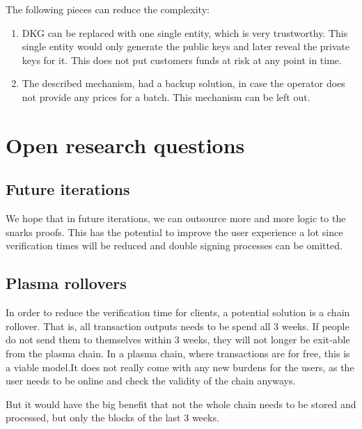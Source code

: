 \documentclass[11pt,parskip=full]{scrartcl}%
\begin{document}
The following pieces can reduce the complexity:
\begin{enumerate}
\item
DKG can be replaced with one single entity, which is very trustworthy.
This single entity would only generate the public keys and later reveal the private keys for it.
This does not put customers funds at risk at any point in time.
\item
The described mechanism, had a backup solution, in case the operator does not provide any prices for a batch.
This mechanism can be left out.
\end{enumerate}

\section{Open research questions}

\subsection{Future iterations}
We hope that in future iterations, we can outsource more and more logic to the snarks proofs.
This has the potential to improve the user experience a lot since verification times will be reduced and double signing processes can be omitted.

\subsection{Plasma rollovers}
In order to reduce the verification time for clients, a potential solution is a chain rollover.
That is, all transaction outputs needs to be spend all 3 weeks.
If people do not send them to themselves within 3 weeks, they will not longer be exit-able from the plasma chain.
In a plasma chain, where transactions are for free, this is a viable model.It does not really come with any new burdens for the users, as the user needs to be online and check the validity of the chain anyways.

But it would have the big benefit that not the whole chain needs to be stored and processed, but only the blocks of the last 3 weeks.
\end{document}

